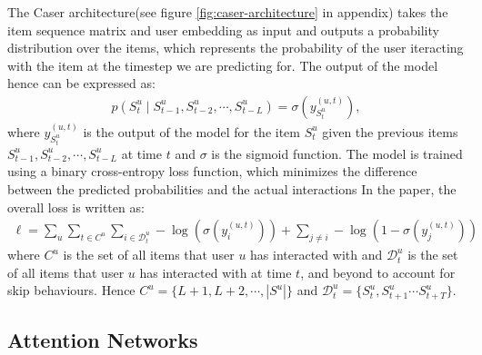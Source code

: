 \documentclass{ieeetj}
\begin{document}
The Caser architecture(see figure \ref{fig:caser-architecture} in appendix) takes the item sequence matrix and user embedding as input and outputs a probability distribution over the items, which represents the probability of the user iteracting with the item at the timestep we are predicting for. The output of the model hence can be expressed as:
\[
\begin{aligned}
	p(S_t^u \mid S_{t-1}^u, S_{t-2}^u, \cdots, S_{t-L}^u) = \sigma(y_{S_t^u}^{(u,t)}),
\end{aligned}
\]
where $y_{S_t^u}^{(u,t)}$ is the output of the model for the item $S_t^u$ given the previous items $S_{t-1}^u, S_{t-2}^u, \cdots, S_{t-L}^u$ at time $t$ and $\sigma$ is the sigmoid function. The model is trained using a binary cross-entropy loss function, which minimizes the difference between the predicted probabilities and the actual interactions In the paper, the overall loss is written as:
\[
\begin{aligned}
	\ell = \sum_u \sum_{t \in C^u} \sum_{i \in \mathcal{D}_t^u} -\log(\sigma(y_i^{(u,t)})) + \sum_{j \neq i} -\log(1 - \sigma(y_j^{(u,t)}))
\end{aligned}
\]
where $C^u$ is the set of all items that user $u$ has interacted with and $\mathcal{D}_t^u$ is the set of all items that user $u$ has interacted with at time $t$, and beyond to account for skip behaviours. Hence $C^u=\{L+1, L+2, \cdots, |S^u|\}$ and $\mathcal{D}_t^u = \{S^u_t , S^u_{t+1} \cdots S^u_{t+T}\}$.

\subsection{Attention Networks}
\end{document}
